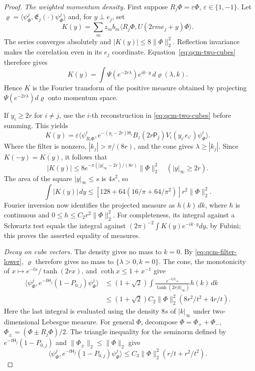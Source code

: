 \documentclass[11pt,letterpaper,reqno]{amsart}
\theoremstyle{definition}
\begin{document}
\begin{proof}
\emph{The weighted momentum density.}
First suppose $R_j\Phi=\varepsilon\Phi$, $\varepsilon\in\{1,-1\}$.
Let $\varrho=\langle\psi^j_\Phi,\mathfrak E_j(\cdot)
\psi^j_\Phi\rangle$ and, for $y\perp e_j$, set
\[
 K(y)=\sum_mz_mb_m\langle R_j\Phi,U(2rme_j+y)\Phi\rangle.
\]
The series converges absolutely and $|K(y)|\le8\|\Phi\|_2^2$.
Reflection invariance makes the correlation even in its $e_j$
coordinate. Equation~\eqref{eq:qcm-two-cubes} therefore gives
\[
 K(y)=\int\Psi(e^{-2r\lambda})e^{ik\cdot y}\,d\varrho(\lambda,k).
\]
Hence $K$ is the Fourier transform of the positive measure obtained
by projecting $\Psi(e^{-2r\lambda})d\varrho$ onto momentum space.

If $y_i\ge2r$ for $i\ne j$, use the $i$-th reconstruction in
\eqref{eq:qcm-two-cubes} before summing. This yields
\[
 K(y)=\varepsilon\langle\psi^i_{R_i\Phi},
 e^{-(y_i-2r)\mathsf H_i}B_z(2r\mathsf P_j)
 V_i(y_{i'}e_{i'})\psi^i_\Phi\rangle.
\]
Where the filter is nonzero, $|k_j|>\pi/(8r)$, and the cone gives
$\lambda\ge|k_j|$. Since $K(-y)=\overline{K(y)}$, it follows that
\[
 |K(y)|\le8e^{-\pi(|y|_\infty-2r)/(8r)}\|\Phi\|_2^2
 \quad(|y|_\infty\ge2r).
\]
The area of the square $|y|_\infty\le s$ is $4s^2$, so
\[
 \int|K(y)|\,dy\le
 [128+64(16/\pi+64/\pi^2)]r^2\|\Phi\|_2^2.
\]
Fourier inversion now identifies the projected measure as $h(k)\,dk$,
where $h$ is continuous and $0\le h\le C_2r^2\|\Phi\|_2^2$.
For completeness, its integral against a Schwartz test equals the
integral against $(2\pi)^{-2}\int K(y)e^{-ik\cdot y}dy$, by Fubini;
this proves the asserted equality of measures.

\emph{Decay on cube vectors.}
The density gives no mass to $k=0$. By
\eqref{eq:qcm-filter-lower}, $\varrho$ therefore gives no mass to
$\{\lambda>0,k=0\}$. The cone, the monotonicity of
$x\mapsto e^{-tx}/\tanh(2rx)$, and $\coth x\le1+x^{-1}$ give
\begin{align*}
 \langle\psi^j_\Phi,e^{-t\mathsf H_j}(1-P_{0,j})\psi^j_\Phi\rangle
 &\le(1+\sqrt2)\int\frac{e^{-t|k|_\infty}}
                            {\tanh(2r|k|_\infty)}h(k)\,dk\\
 &\le(1+\sqrt2)C_2\|\Phi\|_2^2
                  (8r^2/t^2+4r/t).
\end{align*}
Here the last integral is evaluated using the density $8s$ of
$|k|_\infty$ under two-dimensional Lebesgue measure.
For general $\Phi$, decompose
$\Phi=\Phi_++\Phi_-$, $\Phi_\pm=(\Phi\pm R_j\Phi)/2$.
The triangle inequality for the seminorm defined by
$e^{-t\mathsf H_j}(1-P_{0,j})$ and
$\|\Phi_\pm\|_2\le\|\Phi\|_2$ give
\begin{equation}\label{eq:qcm-cube-decay}
 \langle\psi^j_\Phi,e^{-t\mathsf H_j}(1-P_{0,j})\psi^j_\Phi\rangle
 \le C_3\|\Phi\|_2^2(r/t+r^2/t^2).
\end{equation}


\end{proof}
\end{document}
